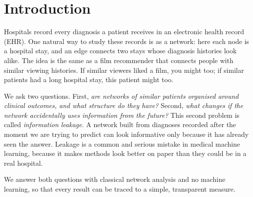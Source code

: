 \section{Introduction}

Hospitals record every diagnosis a patient receives in an electronic health record (EHR). One natural way to study these records is as a network: here each node is a hospital stay, and an edge connects two stays whose diagnosis histories look alike. The idea is the same as a film recommender that connects people with similar viewing histories. If similar viewers liked a film, you might too; if similar patients had a long hospital stay, this patient might too.

We ask two questions. First, \emph{are networks of similar patients organised around clinical outcomes, and what structure do they have?} Second, \emph{what changes if the network accidentally uses information from the future?} This second problem is called \emph{information leakage}. A network built from diagnoses recorded after the moment we are trying to predict can look informative only because it has already seen the answer. Leakage is a common and serious mistake in medical machine learning, because it makes methods look better on paper than they could be in a real hospital.

We answer both questions with classical network analysis and no machine learning, so that every result can be traced to a simple, transparent measure.
